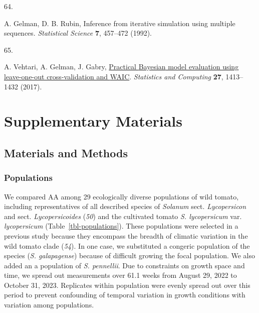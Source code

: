 \documentclass[
  letterpaper,
  DIV=11,
  numbers=noendperiod]{scrartcl}
\newlength{\cslhangindent}
\newlength{\csllabelwidth}
\newenvironment{CSLReferences}[2] %
 {\begin{list}{}{%
  \setlength{\itemindent}{0pt}
  \setlength{\leftmargin}{0pt}
  \setlength{\parsep}{0pt}
  \ifodd #1
   \setlength{\leftmargin}{\cslhangindent}
   \setlength{\itemindent}{-1\cslhangindent}
  \fi
  \setlength{\itemsep}{#2\baselineskip}}}
 {\end{list}}
\newcommand{\CSLLeftMargin}[1]{\parbox[t]{\csllabelwidth}{\strut#1\strut}}
\newcommand{\CSLRightInline}[1]{\parbox[t]{\linewidth - \csllabelwidth}{\strut#1\strut}}
\newcommand{\aax}{$\mathrm{AA}$}
\begin{document}
\begin{CSLReferences}{0}{1}
\CSLLeftMargin{64. }%
\CSLRightInline{A. Gelman, D. B. Rubin, Inference from iterative
simulation using multiple sequences. \emph{Statistical Science}
\textbf{7}, 457--472 (1992).}

\CSLLeftMargin{65. }%
\CSLRightInline{A. Vehtari, A. Gelman, J. Gabry,
\href{https://doi.org/10.1007/s11222-016-9696-4}{Practical {Bayesian}
model evaluation using leave-one-out cross-validation and {WAIC}}.
\emph{Statistics and Computing} \textbf{27}, 1413--1432 (2017).}

\end{CSLReferences}

\newpage{}

\section{Supplementary Materials}\label{supplementary-materials}

\renewcommand{\thefigure}{S\arabic{figure}}
\renewcommand{\thetable}{S\arabic{table}}
\renewcommand{\theequation}{S\arabic{equation}}
\setcounter{figure}{0}
\setcounter{table}{0}
\setcounter{equation}{0}

\subsection{Materials and Methods}\label{sec-methods}

\subsubsection{Populations}\label{populations}

We compared \aax{} among 29 ecologically diverse populations of wild
tomato, including representatives of all described species of
\emph{Solanum} sect. \emph{Lycopersicon} and sect.
\emph{Lycopersicoides} (\emph{50}) and the cultivated tomato \emph{S.
lycopersicum} var. \emph{lycopersicum} (Table~\ref{tbl-populations}).
These populations were selected in a previous study because they
encompass the breadth of climatic variation in the wild tomato clade
(\emph{54}). In one case, we substituted a congeric population of the
species (\emph{S. galapagense}) because of difficult growing the focal
population. We also added an a population of \emph{S. pennellii}. Due to
constraints on growth space and time, we spread out measurements over
61.1 weeks from August 29, 2022 to October 31, 2023. Replicates within
population were evenly spread out over this period to prevent
confounding of temporal variation in growth conditions with variation
among populations.
\end{document}
